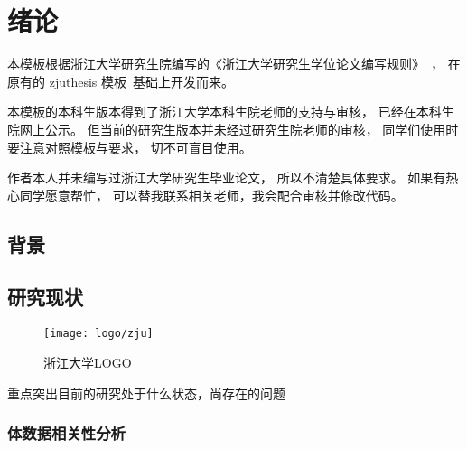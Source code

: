 \chapter{绪论}

本模板根据浙江大学研究生院编写的《浙江大学研究生学位论文编写规则》~\cite{zjugradthesisrules}，
在原有的 zjuthesis 模板~\cite{zjuthesis}基础上开发而来。

本模板的本科生版本\cite{zjuthesisrules}得到了浙江大学本科生院老师的支持与审核，
已经在本科生院网上公示。
但当前的研究生版本并未经过研究生院老师的审核，
同学们使用时要注意对照模板与要求，
切不可盲目使用。

作者本人并未编写过浙江大学研究生毕业论文，
所以不清楚具体要求。
如果有热心同学愿意帮忙，
可以替我联系相关老师，我会配合审核并修改代码。

\section{背景}




\section{研究现状}


\begin{figure}[htbp]
    \centering
    \texttt{[image: logo/zju]}
    \caption{\label{fig:zju-logo}浙江大学LOGO}
\end{figure}

重点突出目前的研究处于什么状态，尚存在的问题

\subsection{体数据相关性分析}
